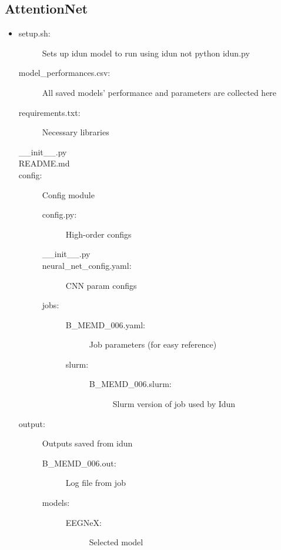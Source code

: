 \subsection*{AttentionNet}
\begin{footnotesize}
\begin{itemize}[label={}, leftmargin=*]
    \item
        \begin{description}
        \item [setup.sh:] Sets up idun model to run using idun not python idun.py
        \item [model\_performances.csv:] All saved models' performance and parameters are collected here
        \item [requirements.txt:] Necessary libraries
        \item [\_\_init\_\_.py]
        \item [README.md]
        \item [config:] Config module
            \begin{description}
            \item [config.py:] High-order configs
            \item [\_\_init\_\_.py]
            \item [neural\_net\_config.yaml:] CNN param configs
            \item [jobs:]
                \begin{description}
                \item [B\_MEMD\_006.yaml:] Job parameters (for easy reference)
                \item [slurm:]
                    \begin{description}
                    \item [B\_MEMD\_006.slurm:] Slurm version of job used by Idun
                    \end{description}
                \end{description}
            \end{description}
        \item [output:] Outputs saved from idun
            \begin{description}
            \item [B\_MEMD\_006.out:] Log file from job
            \item [models:] 
                \begin{description}
                \item [EEGNeX:] Selected model

\end{description}
\end{description}
\end{description}
\end{itemize}
\end{footnotesize}
